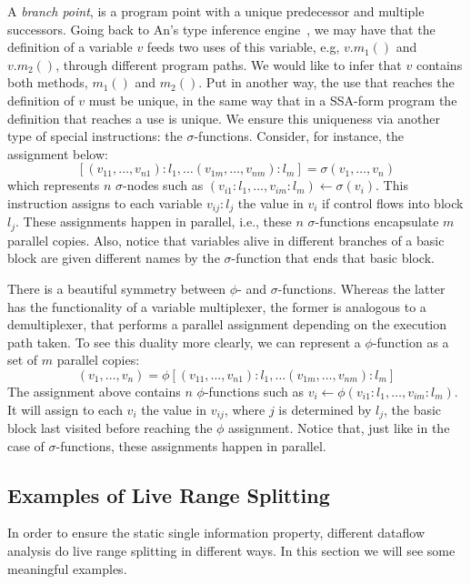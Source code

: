 A {\em branch point}, is a program point with a unique predecessor and multiple
successors.
Going back to An's type inference engine~\cite{An11}, we may have that the
definition of a variable $v$ feeds two uses of this variable, e.g, $v.m_1()$
and $v.m_2()$, through different program paths.
We would like to infer that $v$ contains both methods, $m_1()$ and $m_2()$.
Put in another way, the use that reaches the definition of $v$ must be unique,
in the same way that in a SSA-form program the definition that reaches a use
is unique.
We ensure this uniqueness via another type of special instructions: the
$\sigma$-functions.
Consider, for instance, the assignment below:
\[
[(v_{11}, \ldots, v_{n1}):l_1, \ldots (v_{1m}, \ldots, v_{nm}):l_m] =
 \sigma(v_1, \ldots, v_n)
\]
which represents $n$ $\sigma$-nodes such as
$(v_{i1}:l_1, \ldots, v_{im}:l_m) \leftarrow \sigma (v_i)$.
This instruction assigns to each variable $v_{ij}:l_j$ the
value in $v_i$ if control flows into block $l_j$.
These assignments happen in parallel, i.e., these $n$
$\sigma$-functions encapsulate $m$ parallel copies.
Also, notice that variables alive in different branches of a basic block are
given different names by the $\sigma$-function that ends that basic block.

There is a beautiful symmetry between $\phi$- and $\sigma$-functions.
Whereas the latter has the functionality of a variable multiplexer, the former
is analogous to a demultiplexer, that performs a parallel assignment depending
on the execution path taken.
To see this duality more clearly, we can represent a $\phi$-function as a
set of $m$ parallel copies:
\[
(v_1, \ldots, v_n) = \phi[(v_{11}, \ldots, v_{n1}):l_1, \ldots (v_{1m}, \ldots,
v_{nm}):l_m]
\]
The assignment above contains $n$ $\phi$-functions such as
$v_i \leftarrow \phi(v_{i1}:l_1, \ldots, v_{im}:l_m)$.
It will assign to each $v_i$ the value in $v_{ij}$, where $j$ is determined by
$l_j$, the basic block last visited  before reaching the $\phi$ assignment.
Notice that, just like in the case of $\sigma$-functions, these assignments
happen in parallel.

\subsection{Examples of Live Range Splitting}
\label{sub:ssi:examples}

In order to ensure the static single information property, different dataflow
analysis do live range splitting in different ways.
In this section we will see some meaningful examples.

